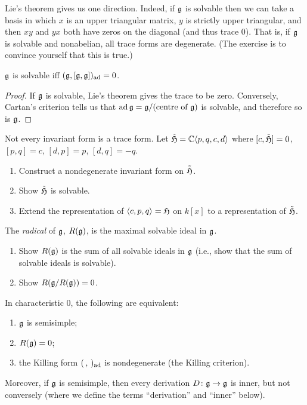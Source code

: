 \begin{exercise}
Lie's theorem gives us one direction. Indeed, if $\mathfrak{g}$ is solvable then we can
take a basis in which $x$ is an upper triangular matrix, $y$ is strictly upper
triangular, and then $xy$ and $yx$ both have zeros on the diagonal (and thus
trace $0$). That is, if $\mathfrak{g}$ is solvable and nonabelian, all trace forms are
degenerate. (The exercise is to convince yourself that this is true.)
\end{exercise}

\begin{corollary}
$\mathfrak{g}$ is solvable iff $(\mathfrak{g}, [\mathfrak{g}, \mathfrak{g}])_{\operatorname{ad}} = 0$.
\end{corollary}

\begin{proof}
If $\mathfrak{g}$ is solvable, Lie's theorem gives the trace to be zero. Conversely,
Cartan's criterion tells us that $\operatorname{ad} \mathfrak{g} = \mathfrak{g}/(\text{centre of } \mathfrak{g})$ is
solvable, and therefore so is $\mathfrak{g}$.
\end{proof}

\begin{exercise}
Not every invariant form is a trace form. Let
$\tilde{\mathfrak{H}} = \mathbb{C}\langle p, q, c, d\rangle$ where $[c, \tilde{\mathfrak{H}}] = 0$,
$[p, q] = c$, $[d, p] = p$, $[d, q] = -q$.
\begin{enumerate}
  \item Construct a nondegenerate invariant form on $\tilde{\mathfrak{H}}$.
  \item Show $\tilde{\mathfrak{H}}$ is solvable.
  \item Extend the representation of $\langle c, p, q\rangle = \mathfrak{H}$ on
    $k[x]$ to a representation of $\tilde{\mathfrak{H}}$.
\end{enumerate}
\end{exercise}

\begin{definition}
The \emph{radical} of $\mathfrak{g}$, $R(\mathfrak{g})$, is the maximal solvable ideal in $\mathfrak{g}$.
\end{definition}

\begin{exercise}\leavevmode
\begin{enumerate}
  \item Show $R(\mathfrak{g})$ is the sum of all solvable ideals in $\mathfrak{g}$ (i.e., show
    that the sum of solvable ideals is solvable).
  \item Show $R(\mathfrak{g}/R(\mathfrak{g})) = 0$.
\end{enumerate}
\end{exercise}

\begin{theorem}
In characteristic $0$, the following are equivalent:
\begin{enumerate}
  \item $\mathfrak{g}$ is semisimple;
  \item $R(\mathfrak{g}) = 0$;
  \item the Killing form $(\,,\,)_{\operatorname{ad}}$ is nondegenerate (the Killing
    criterion).
\end{enumerate}
Moreover, if $\mathfrak{g}$ is semisimple, then every derivation $D\colon \mathfrak{g} \to \mathfrak{g}$ is
inner, but not conversely (where we define the terms ``derivation'' and
``inner'' below).
\end{theorem}

